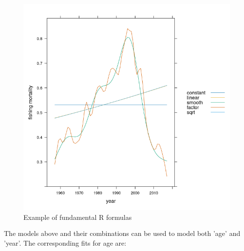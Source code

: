 \documentclass[a4paper,english,11pt]{article}
\begin{document}
\begin{knitrout}
\begin{figure}[H]
{\centering \includegraphics[width=.9\linewidth]{figure/fund_forms-1} 

}

\caption[Example of fundamental R formulas]{Example of fundamental R formulas}\label{fig:fund_forms}
\end{figure}

\end{knitrout}

The models above and their combinations can be used to model both 'age' and 'year'. The corresponding fits for age are:
\end{document}
